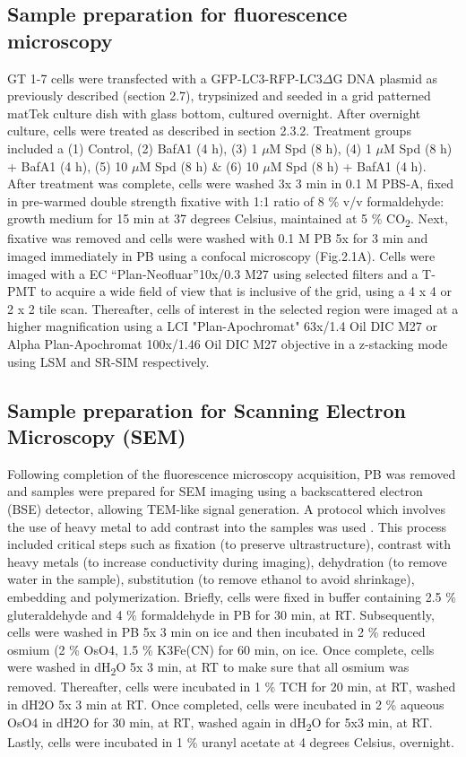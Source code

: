 \subsection{Sample preparation for fluorescence microscopy}
GT 1-7 cells were transfected with a GFP-LC3-RFP-LC3$\Delta$G DNA plasmid as previously described (section 2.7), trypsinized and seeded in a grid patterned matTek culture dish with glass bottom, cultured overnight. After overnight culture, cells were treated as described in section 2.3.2. Treatment groups included a (1) Control, (2) BafA1 (4 h), (3) 1 $\mu$M Spd (8 h), (4) 1 $\mu$M Spd (8 h) + BafA1 (4 h), (5) 10 $\mu$M Spd (8 h) \& (6) 10 $\mu$M Spd (8 h) + BafA1 (4 h). After treatment was complete, cells were washed 3x 3 min in 0.1 M PBS-A, fixed in pre-warmed double strength fixative with 1:1 ratio of 8 \% v/v formaldehyde: growth medium for 15 min at 37 degrees Celsius, maintained at 5 \% CO\textsubscript{2}. Next, fixative was removed and cells were washed with 0.1 M PB 5x for 3 min and imaged immediately in PB using a confocal microscopy (Fig.2.1A). Cells were imaged with a EC “Plan-Neofluar”10x/0.3 M27 using selected filters and a T-PMT to acquire a wide field of view that is inclusive of the grid, using a 4 x 4 or 2 x 2 tile scan. Thereafter, cells of interest in the selected region were imaged at a higher magnification using a LCI "Plan-Apochromat" 63x/1.4 Oil DIC M27 or Alpha Plan-Apochromat 100x/1.46 Oil DIC M27 objective in a z-stacking mode using LSM and SR-SIM respectively. 


\subsection{Sample preparation for Scanning Electron Microscopy (SEM)}
Following completion of the fluorescence microscopy acquisition, PB was removed and samples were prepared for SEM imaging using a backscattered electron (BSE) detector, allowing TEM-like signal generation. A protocol which involves the use of heavy metal to add contrast into the samples was used \citep{Russell2017}. This process included critical steps such as fixation (to preserve ultrastructure), contrast with heavy metals (to increase conductivity during imaging), dehydration (to remove water in the sample), substitution (to remove ethanol to avoid shrinkage), embedding and polymerization. Briefly, cells were fixed in buffer containing 2.5 \% gluteraldehyde and 4 \% formaldehyde in PB for 30 min, at RT. Subsequently, cells were washed in PB 5x 3 min on ice and then incubated in 2 \% reduced osmium (2 \% OsO4, 1.5 \% K3Fe(CN) for 60 min, on ice. Once complete, cells were washed in dH\textsubscript{2}O 5x 3 min, at RT to make sure that all osmium was removed. Thereafter, cells were incubated in 1 \% TCH for 20 min, at RT, washed in dH2O 5x 3 min at RT. Once completed, cells were incubated in 2 \% aqueous OsO4 in dH2O for 30 min, at RT, washed again in dH\textsubscript{2}O for 5x3 min, at RT. Lastly, cells were incubated in 1 \% uranyl acetate at 4 degrees Celsius, overnight.

